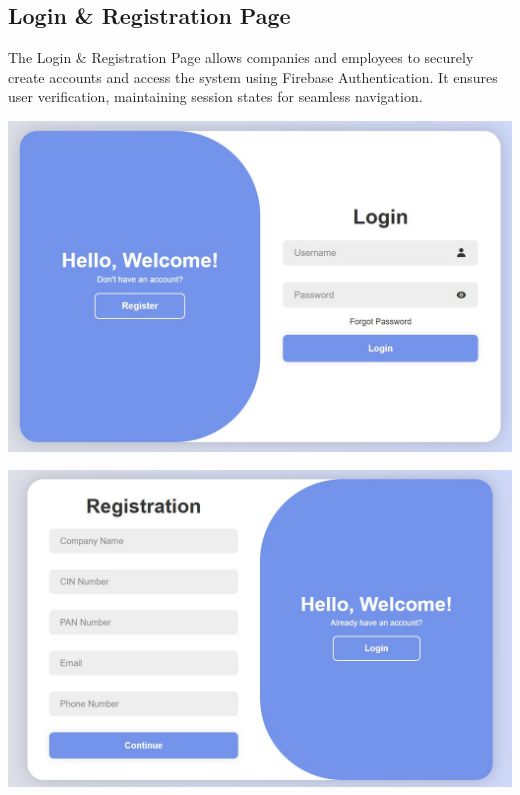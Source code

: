 \subsection{Login \& Registration Page}
The Login \& Registration Page allows companies and employees to securely create accounts and access the system using Firebase Authentication. It ensures user verification, maintaining session states for seamless navigation.
\begin{center}
    \begin{minipage}{0.45\textwidth}
        \centering
        \includegraphics[width=\linewidth]{6/login.jpg}
    \end{minipage}
    \hfill
    \begin{minipage}{0.45\textwidth}
        \centering
        \includegraphics[width=\linewidth]{6/registration.jpg}
    \end{minipage}
    

\end{center}
